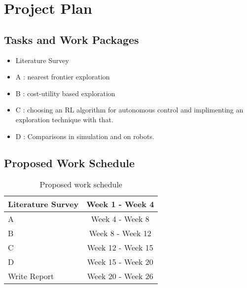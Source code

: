 \section{Project Plan}
\subsection{Tasks and Work Packages}
\begin{itemize}
\item Literature Survey
\item A : nearest frontier exploration
\item B : cost-utility based exploration
\item C : choosing an RL algorithm for autonomous control and implimenting an exploration technique
with that.
\item D : Comparisons in simulation and on robots.
\end{itemize}
\subsection{Proposed Work Schedule}
\begin{table}[H]
\centering
\label{tbl:work_schedule}
\caption{Proposed work schedule}
\begin{tabular}{|l|c|}
\hline
Literature Survey & Week 1 - Week 4\\
\hline
A & Week 4 - Week 8\\
\hline
B & Week 8 - Week 12 \\
\hline
C & Week 12 - Week 15 \\
\hline
D & Week 15 - Week 20 \\
\hline
Write Report & Week 20 - Week 26 \\
\hline
\end{tabular}
\end{table}
